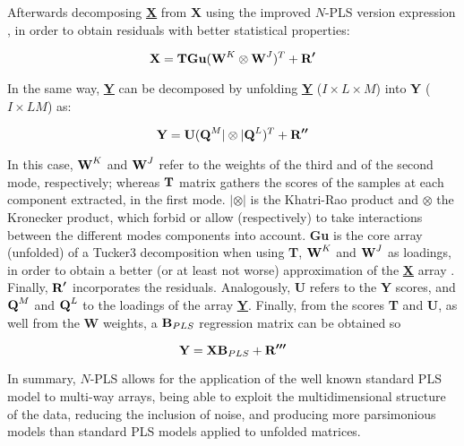 Afterwards decomposing \textbf{\underline{X}} from \textbf{X} using the improved $N$-PLS version expression \parencite{bro2001difference}, in order to obtain residuals with better statistical properties:

\begin{equation}
\textbf{\text{X}}=\textbf{\text{T}}\textbf{\text{Gu}}(\textbf{\text{W}}^{K}\otimes{}\textbf{\text{W}}^{J})^{T}+\textbf{\text{R}}^{\boldsymbol{\prime{}}}
\label{equation02}
\end{equation}

In the same way, \textbf{\underline{Y}} can be decomposed by unfolding \textbf{\underline{Y}} ($I \times L \times M$) into \textbf{Y} ($I \times LM$) as:

\begin{equation}
\textbf{\text{Y}}=\textbf{\text{U}}(\textbf{\text{Q}}^{M}|\otimes{}|\textbf{\text{Q}}^{L})^{T}+\textbf{\text{R}}^{\boldsymbol{\prime{}\prime{}}}
\label{equation03}
\end{equation}

In this case, $\textbf{\text{W}}^{K}$ and $\textbf{\text{W}}^{J}$ refer to the weights of the third and of the second mode, respectively; whereas $\textbf{\text{T}}$ matrix gathers the scores of the samples at each component extracted, in the first mode. $|\otimes{}|$ is the Khatri-Rao product and $\otimes{}$ the Kronecker product, which forbid or allow (respectively) to take interactions between the different modes components into account. 
\textbf{Gu} is the core array (unfolded) of a Tucker3 decomposition when using \textbf{T}, $\textbf{\text{W}}^{K}$ and $\textbf{\text{W}}^{J}$ as loadings, in order to obtain a better (or at least not worse) approximation of the \textbf{\underline{X}} array \parencite{smilde2005multi}. Finally, $\textbf{\text{R}}^{\boldsymbol{\prime{}}}$ incorporates the residuals. Analogously, \textbf{U} refers to the \textbf{Y} scores, and $\textbf{\text{Q}}^{M}$ and $\textbf{\text{Q}}^{L}$ to the loadings of the array \textbf{\underline{Y}}.
Finally, from the scores \textbf{T} and \textbf{U}, as well from the \textbf{W} weights, a $\textbf{\text{B}}_{PLS}$ regression matrix can be obtained \parencite{bro1998multi} so

\begin{equation}
\textbf{\text{Y}}=\textbf{\text{X}}\textbf{\text{B}}_{PLS}+\textbf{\text{R}}^{\boldsymbol{\prime{}\prime{}\prime{}}}
\label{equation04}
\end{equation}

In summary, $N$-PLS allows for the application of the well known standard PLS model to multi-way arrays, being able to exploit the multidimensional structure of the data, reducing the inclusion of noise, and producing more parsimonious models than standard PLS models applied to unfolded matrices. 